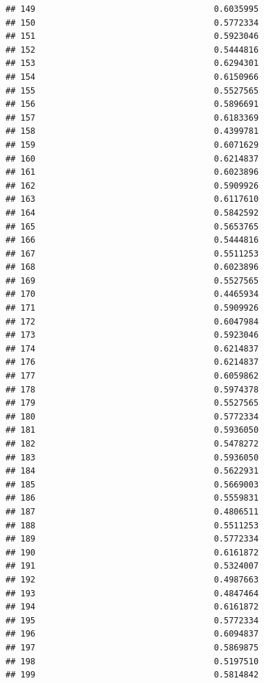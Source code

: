 \documentclass[
  american,
  man,floatsintext]{apa7}
\begin{document}
\begin{verbatim}
## 149                                    0.6035995
## 150                                    0.5772334
## 151                                    0.5923046
## 152                                    0.5444816
## 153                                    0.6294301
## 154                                    0.6150966
## 155                                    0.5527565
## 156                                    0.5896691
## 157                                    0.6183369
## 158                                    0.4399781
## 159                                    0.6071629
## 160                                    0.6214837
## 161                                    0.6023896
## 162                                    0.5909926
## 163                                    0.6117610
## 164                                    0.5842592
## 165                                    0.5653765
## 166                                    0.5444816
## 167                                    0.5511253
## 168                                    0.6023896
## 169                                    0.5527565
## 170                                    0.4465934
## 171                                    0.5909926
## 172                                    0.6047984
## 173                                    0.5923046
## 174                                    0.6214837
## 176                                    0.6214837
## 177                                    0.6059862
## 178                                    0.5974378
## 179                                    0.5527565
## 180                                    0.5772334
## 181                                    0.5936050
## 182                                    0.5478272
## 183                                    0.5936050
## 184                                    0.5622931
## 185                                    0.5669003
## 186                                    0.5559831
## 187                                    0.4806511
## 188                                    0.5511253
## 189                                    0.5772334
## 190                                    0.6161872
## 191                                    0.5324007
## 192                                    0.4987663
## 193                                    0.4847464
## 194                                    0.6161872
## 195                                    0.5772334
## 196                                    0.6094837
## 197                                    0.5869875
## 198                                    0.5197510
## 199                                    0.5814842

\end{verbatim}
\end{document}
